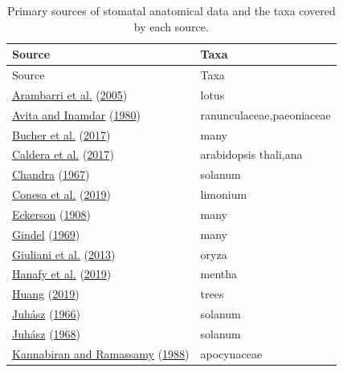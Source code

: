 \documentclass[
  10pt,
]{article}
\begin{document}
\begin{longtable}[]{@{}ll@{}}
\caption{\label{tab:sources}Primary sources of stomatal anatomical data and the taxa covered by each source.}\tabularnewline
\toprule
Source & Taxa \\
\midrule
\endfirsthead
\toprule
Source & Taxa \\
\midrule
\endhead
\protect\hyperlink{ref-arambarri_taxonomy_2005}{Arambarri et al.} (\protect\hyperlink{ref-arambarri_taxonomy_2005}{2005}) & lotus \\
\protect\hyperlink{ref-avita_structure_1980}{Avita and Inamdar} (\protect\hyperlink{ref-avita_structure_1980}{1980}) & ranunculaceae,paeoniaceae \\
\protect\hyperlink{ref-bucher_stomatal_2017}{Bucher et al.} (\protect\hyperlink{ref-bucher_stomatal_2017}{2017}) & many \\
\protect\hyperlink{ref-caldera_effects_2017}{Caldera et al.} (\protect\hyperlink{ref-caldera_effects_2017}{2017}) & arabidopsis thali,ana \\
\protect\hyperlink{ref-chandra_epidermal_1967}{Chandra} (\protect\hyperlink{ref-chandra_epidermal_1967}{1967}) & solanum \\
\protect\hyperlink{ref-conesa_stomatal_2019}{Conesa et al.} (\protect\hyperlink{ref-conesa_stomatal_2019}{2019}) & limonium \\
\protect\hyperlink{ref-eckerson_number_1908}{Eckerson} (\protect\hyperlink{ref-eckerson_number_1908}{1908}) & many \\
\protect\hyperlink{ref-gindel_stomatal_1969}{Gindel} (\protect\hyperlink{ref-gindel_stomatal_1969}{1969}) & many \\
\protect\hyperlink{ref-giuliani_coordination_2013}{Giuliani et al.} (\protect\hyperlink{ref-giuliani_coordination_2013}{2013}) & oryza \\
\protect\hyperlink{ref-hanafy_leaf_2019}{Hanafy et al.} (\protect\hyperlink{ref-hanafy_leaf_2019}{2019}) & mentha \\
\protect\hyperlink{ref-huang_leaf_2019}{Huang} (\protect\hyperlink{ref-huang_leaf_2019}{2019}) & trees \\
\protect\hyperlink{ref-juhasz_effect_1966}{Juhász} (\protect\hyperlink{ref-juhasz_effect_1966}{1966}) & solanum \\
\protect\hyperlink{ref-juhasz_comparative_1968}{Juhász} (\protect\hyperlink{ref-juhasz_comparative_1968}{1968}) & solanum \\
\protect\hyperlink{ref-kannabiran_foliar_1988}{Kannabiran and Ramassamy} (\protect\hyperlink{ref-kannabiran_foliar_1988}{1988}) & apocynaceae \\

\end{longtable}
\end{document}
